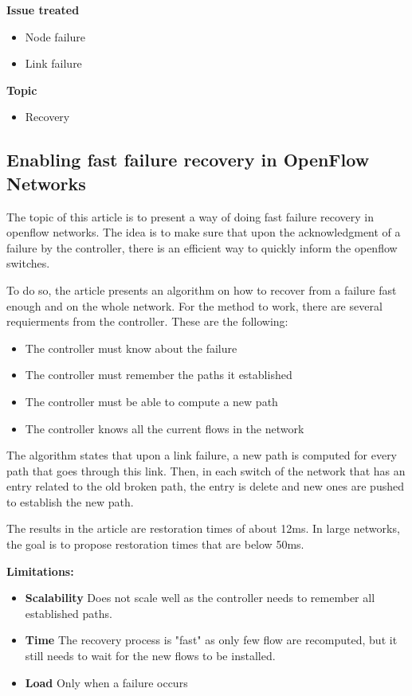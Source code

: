 \documentclass[compsoc]{IEEEtran}
\begin{document}
\textbf{Issue treated}
\begin{itemize}
	\item Node failure
	\item Link failure
\end{itemize}

\textbf{Topic}
\begin{itemize}
	\item Recovery
\end{itemize}

\subsection{Enabling fast failure recovery in OpenFlow Networks \cite{2911632}}
The topic of this article is to present a way of doing fast failure recovery in openflow networks.
The idea is to make sure that upon the acknowledgment of a failure by the controller, there is an efficient way to quickly inform the openflow switches.

To do so, the article presents an algorithm on how to recover from a failure fast enough and on the whole network.
For the method to work, there are several requierments from the controller. These are the following:
\begin{itemize}
	\item The controller must know about the failure
	\item The controller must remember the paths it established
	\item The controller must be able to compute a new path
	\item The controller knows all the current flows in the network
\end{itemize}
The algorithm states that upon a link failure, a new path is computed for every path that goes through this link.
Then, in each switch of the network that has an entry related to the old broken path, the entry is delete and new ones are pushed to establish the new path.

The results in the article are restoration times of about 12ms. In large networks, the goal is to propose restoration times that are below 50ms.

\textbf{Limitations:}
\begin{itemize}
	\item \textbf{Scalability} Does not scale well as the controller needs to remember all established paths.
	\item \textbf{Time} The recovery process is "fast" as only few flow are recomputed, but it still needs to wait for the new flows to be installed.
	\item \textbf{Load} Only when a failure occurs
\end{itemize}
\end{document}
